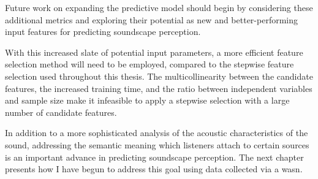 Future work on expanding the predictive model should begin by considering these additional metrics and exploring their potential as new and better-performing input features for predicting soundscape perception.

With this increased slate of potential input parameters, a more efficient feature selection method will need to be employed, compared to the stepwise feature selection used throughout this thesis. The multicollinearity between the candidate features, the increased training time, and the ratio between independent variables and sample size make it infeasible to apply a stepwise selection with a large number of candidate features. 

In addition to a more sophisticated analysis of the acoustic characteristics of the sound, addressing the semantic meaning which listeners attach to certain sources is an important advance in predicting soundscape perception. The next chapter presents how I have begun to address this goal using data collected via a \gls{wasn}.